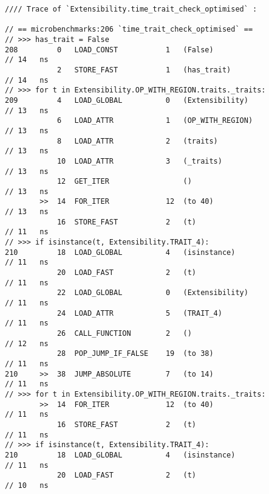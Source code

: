\begin{code}
    \begin{verbatim}
//// Trace of `Extensibility.time_trait_check_optimised` :

// == microbenchmarks:206 `time_trait_check_optimised` ==
// >>> has_trait = False
208         0   LOAD_CONST           1   (False)                                            // 14   ns
            2   STORE_FAST           1   (has_trait)                                        // 14   ns
// >>> for t in Extensibility.OP_WITH_REGION.traits._traits:
209         4   LOAD_GLOBAL          0   (Extensibility)                                    // 13   ns
            6   LOAD_ATTR            1   (OP_WITH_REGION)                                   // 13   ns
            8   LOAD_ATTR            2   (traits)                                           // 13   ns
            10  LOAD_ATTR            3   (_traits)                                          // 13   ns
            12  GET_ITER                 ()                                                 // 13   ns
        >>  14  FOR_ITER             12  (to 40)                                            // 13   ns
            16  STORE_FAST           2   (t)                                                // 11   ns
// >>> if isinstance(t, Extensibility.TRAIT_4):
210         18  LOAD_GLOBAL          4   (isinstance)                                       // 11   ns
            20  LOAD_FAST            2   (t)                                                // 11   ns
            22  LOAD_GLOBAL          0   (Extensibility)                                    // 11   ns
            24  LOAD_ATTR            5   (TRAIT_4)                                          // 11   ns
            26  CALL_FUNCTION        2   ()                                                 // 12   ns
            28  POP_JUMP_IF_FALSE    19  (to 38)                                            // 11   ns
210     >>  38  JUMP_ABSOLUTE        7   (to 14)                                            // 11   ns
// >>> for t in Extensibility.OP_WITH_REGION.traits._traits:
        >>  14  FOR_ITER             12  (to 40)                                            // 11   ns
            16  STORE_FAST           2   (t)                                                // 11   ns
// >>> if isinstance(t, Extensibility.TRAIT_4):
210         18  LOAD_GLOBAL          4   (isinstance)                                       // 11   ns
            20  LOAD_FAST            2   (t)                                                // 10   ns

\end{verbatim}
\end{code}
